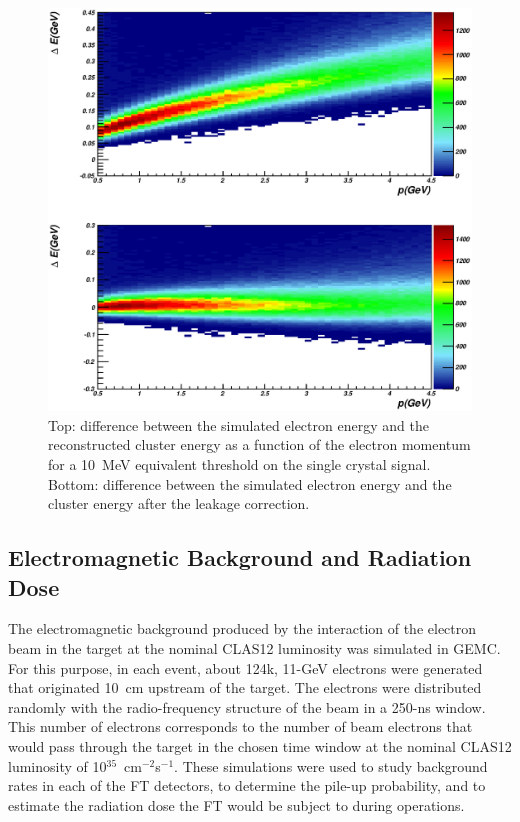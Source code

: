 \begin{figure}
\includegraphics[height=\columnwidth]{fig/gemc_leakage.eps}
\caption{Top: difference between the simulated electron energy and the reconstructed cluster energy as a
  function of the electron momentum for a 10~MeV equivalent threshold on the single crystal signal. Bottom:
  difference between the simulated electron energy and the cluster energy after the leakage correction.}
\label{fig:gemc_leakage}
\end{figure}

\subsection{Electromagnetic Background and Radiation Dose}

The electromagnetic background produced by the interaction of the electron beam in the target  at the nominal
CLAS12 luminosity was simulated in GEMC. For this purpose, in each event, about 124k, 11-GeV electrons were
generated that originated 10~cm upstream of the target. The electrons were distributed randomly with the
radio-frequency structure of the beam in a 250-ns window. This number of electrons corresponds to the number
of beam electrons that would pass through the target in the chosen time window at the nominal CLAS12 luminosity
of 10$^{35}$~cm$^{-2}$s$^{-1}$. These simulations were used to study background rates in each of the FT detectors,
to determine the pile-up probability, and to estimate the radiation dose the FT would be subject to during operations.

